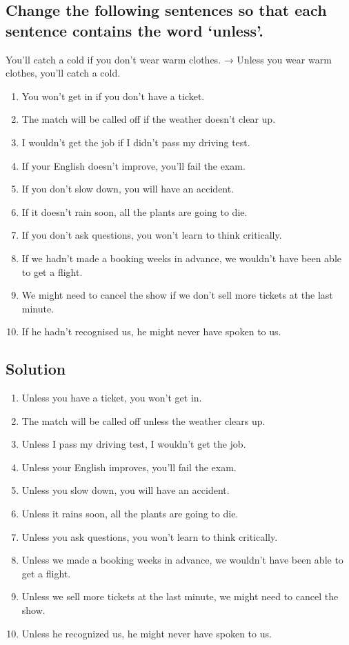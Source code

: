 \subsection*{Change the following sentences so that each sentence contains the word ‘unless’.}
You’ll catch a cold if you don’t wear warm clothes. → Unless you wear warm clothes,
you’ll catch a cold.
\begin{enumerate}
      \item You won’t get in if you don’t have a ticket.
      \item The match will be called off if the weather doesn’t clear up.
      \item I wouldn’t get the job if I didn’t pass my driving test.
      \item If your English doesn’t improve, you’ll fail the exam.
      \item If you don’t slow down, you will have an accident.
      \item If it doesn’t rain soon, all the plants are going to die.
      \item If you don’t ask questions, you won’t learn to think critically.
      \item If we hadn’t made a booking weeks in advance, we wouldn’t have been able to get a flight.
      \item We might need to cancel the show if we don’t sell more tickets at the last minute.
      \item If he hadn’t recognised us, he might never have spoken to us.
\end{enumerate}

\subsection*{Solution}
\begin{enumerate}
      \item Unless you have a ticket, you won’t get in.
      \item The match will be called off unless the weather clears up.
      \item Unless I pass my driving test, I wouldn’t get the job.
      \item Unless your English improves, you’ll fail the exam.
      \item Unless you slow down, you will have an accident.
      \item Unless it rains soon, all the plants are going to die.
      \item Unless you ask questions, you won’t learn to think critically.
      \item Unless we made a booking weeks in advance, we wouldn’t have been able to get a flight.
      \item Unless we sell more tickets at the last minute, we might need to cancel the show.
      \item Unless he recognized us, he might never have spoken to us.
\end{enumerate}

